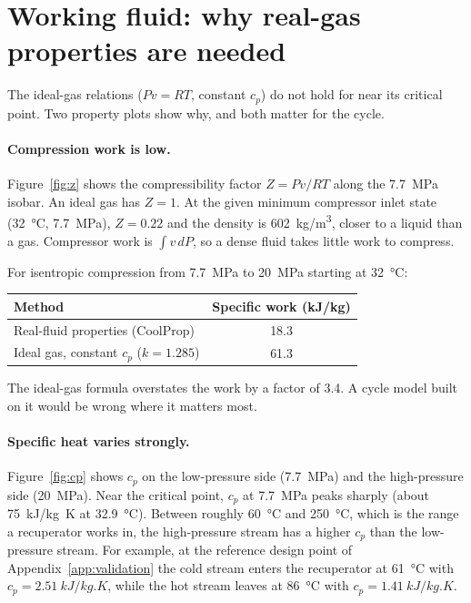 \section{Working fluid: why real-gas properties are needed}

The ideal-gas relations ($Pv = RT$, constant $c_p$) do not hold for \cotwo{} near its critical point. Two property plots show why, and both matter for the cycle.

\paragraph{Compression work is low.} Figure~\ref{fig:z} shows the compressibility factor $Z = Pv/RT$ along the \SI{7.7}{MPa} isobar. An ideal gas has $Z = 1$. At the given minimum compressor inlet state (\SI{32}{\celsius}, \SI{7.7}{MPa}), $Z = 0.22$ and the density is \SI{602}{kg/m^3}, closer to a liquid than a gas. Compressor work is $\int v\,dP$, so a dense fluid takes little work to compress.

For isentropic compression from \SI{7.7}{MPa} to \SI{20}{MPa} starting at \SI{32}{\celsius}:
\begin{center}
\begin{tabular}{lS[table-format=2.1]}
\toprule
Method & {Specific work (\si{kJ/kg})}\\
\midrule
Real-fluid properties (CoolProp) & 18.3\\
Ideal gas, constant $c_p$ ($k = 1.285$) & 61.3\\
\bottomrule
\end{tabular}
\end{center}
The ideal-gas formula overstates the work by a factor of 3.4. A cycle model built on it would be wrong where it matters most.

\paragraph{Specific heat varies strongly.} Figure~\ref{fig:cp} shows $c_p$ on the low-pressure side (\SI{7.7}{MPa}) and the high-pressure side (\SI{20}{MPa}). Near the critical point, $c_p$ at \SI{7.7}{MPa} peaks sharply (about \SI{75}{kJ/kg.K} at \SI{32.9}{\celsius}). Between roughly \SI{60}{\celsius} and \SI{250}{\celsius}, which is the range a recuperator works in, the high-pressure stream has a higher $c_p$ than the low-pressure stream. For example, at the reference design point of Appendix~\ref{app:validation} the cold stream enters the recuperator at \SI{61}{\celsius} with $c_p = \SI{2.51}{kJ/kg.K}$, while the hot stream leaves at \SI{86}{\celsius} with $c_p = \SI{1.41}{kJ/kg.K}$.

